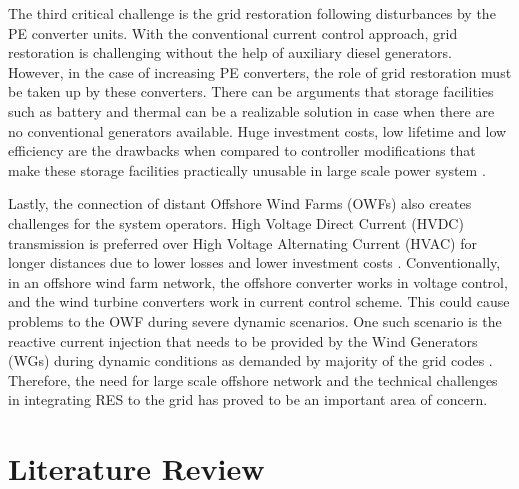 The third critical challenge is the grid restoration following disturbances by the \gls{PE} converter units. With the conventional current control approach, grid restoration is challenging without the help of auxiliary diesel generators. However, in the case of increasing \gls{PE} converters, the role of grid restoration must be taken up by these converters. There can be arguments that storage facilities such as battery and thermal can be a realizable solution in case when there are no conventional generators available. Huge investment costs, low lifetime and low efficiency are the drawbacks when compared to controller modifications that make these storage facilities practically unusable in large scale power system \cite{telaretti_economic_2016}.  

Lastly, the connection of distant Offshore Wind Farms (\gls{OWF}s) also creates challenges for the system operators. High Voltage Direct Current (\gls{HVDC}) transmission is preferred over High Voltage Alternating Current (\gls{HVAC}) for longer distances due to lower losses and lower investment costs \cite{ryndzionek_evolution_2020}. Conventionally, in an offshore wind farm network, the offshore converter works in voltage control, and the wind turbine converters work in current control scheme. This could cause problems to the \gls{OWF} during severe dynamic scenarios. One such scenario is the reactive current injection that needs to be provided by the Wind Generators (\gls{WG}s) during dynamic conditions as demanded by majority of the grid codes \cite{mohseni_review_2012}. Therefore, the need for large scale offshore network and the technical challenges in integrating \gls{RES} to the grid has proved to be an important area of concern.

\section{Literature Review}

